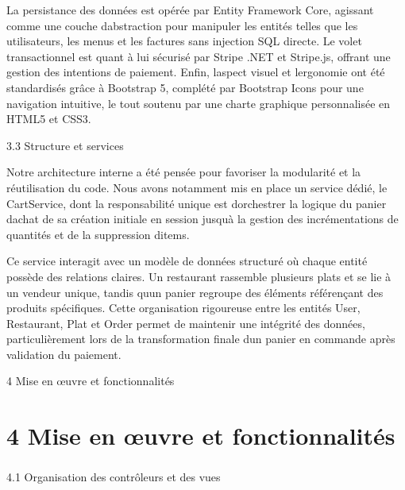\documentclass[
]{article}
\begin{document}
La persistance des données est opérée par Entity Framework Core,
agissant comme une couche d\textquotesingle abstraction pour manipuler
les entités telles que les utilisateurs, les menus et les factures sans
injection SQL directe. Le volet transactionnel est quant à lui sécurisé
par Stripe .NET et Stripe.js, offrant une gestion des intentions de
paiement. Enfin, l\textquotesingle aspect visuel et
l\textquotesingle ergonomie ont été standardisés grâce à Bootstrap 5,
complété par Bootstrap Icons pour une navigation intuitive, le tout
soutenu par une charte graphique personnalisée en HTML5 et CSS3.

3.3 Structure et services

Notre architecture interne a été pensée pour favoriser la modularité et
la réutilisation du code. Nous avons notamment mis en place un service
dédié, le CartService, dont la responsabilité unique est
d\textquotesingle orchestrer la logique du panier
d\textquotesingle achat de sa création initiale en session
jusqu\textquotesingle à la gestion des incrémentations de quantités et
de la suppression d\textquotesingle items.

Ce service interagit avec un modèle de données structuré où chaque
entité possède des relations claires. Un restaurant rassemble plusieurs
plats et se lie à un vendeur unique, tandis qu\textquotesingle un panier
regroupe des éléments référençant des produits spécifiques. Cette
organisation rigoureuse entre les entités User, Restaurant, Plat et
Order permet de maintenir une intégrité des données, particulièrement
lors de la transformation finale d\textquotesingle un panier en commande
après validation du paiement.

4 Mise en œuvre et fonctionnalités

\section{4 Mise en œuvre et
fonctionnalités}\label{mise-en-ux153uvre-et-fonctionnalituxe9s}

\subsubsection{}\label{section-6}

4.1 Organisation des contrôleurs et des vues
\end{document}
